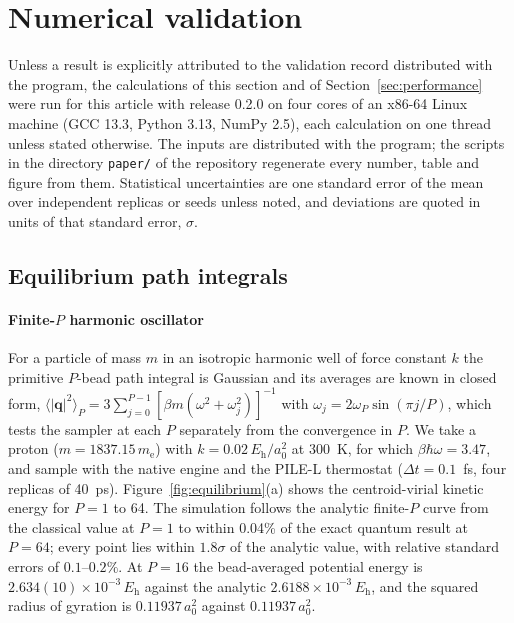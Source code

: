 \documentclass[preprint,12pt]{elsarticle}
\newcommand{\code}[1]{\texttt{#1}}
\newcommand{\Eh}{E_{\mathrm{h}}}
\begin{document}
\section{Numerical validation}
\label{sec:validation}

Unless a result is explicitly attributed to the validation record distributed with the program, the calculations of this section and of Section~\ref{sec:performance} were run for this article with release 0.2.0 on four cores of an x86-64 Linux machine (GCC 13.3, Python 3.13, NumPy 2.5), each calculation on one thread unless stated otherwise. The inputs are distributed with the program; the scripts in the directory \code{paper/} of the repository regenerate every number, table and figure from them. Statistical uncertainties are one standard error of the mean over independent replicas or seeds unless noted, and deviations are quoted in units of that standard error, $\sigma$.

\subsection{Equilibrium path integrals}
\label{sec:val-equilibrium}

\paragraph{Finite-$P$ harmonic oscillator} For a particle of mass $m$ in an isotropic harmonic well of force constant $k$ the primitive $P$-bead path integral is Gaussian and its averages are known in closed form,
$\langle|\mathbf q|^{2}\rangle_P=3\sum_{j=0}^{P-1}[\beta m(\omega^{2}+\omega_j^{2})]^{-1}$ with $\omega_j=2\omega_P\sin(\pi j/P)$, which tests the sampler at each $P$ separately from the convergence in $P$. We take a proton ($m=1837.15\,m_{\mathrm e}$) with $k=0.02\,\Eh/a_0^{2}$ at 300~K, for which $\beta\hbar\omega=3.47$, and sample with the native engine and the PILE-L thermostat ($\Delta t=0.1$~fs, four replicas of 40~ps). Figure~\ref{fig:equilibrium}(a) shows the centroid-virial kinetic energy for $P=1$ to 64. The simulation follows the analytic finite-$P$ curve from the classical value at $P=1$ to within 0.04\% of the exact quantum result at $P=64$; every point lies within $1.8\sigma$ of the analytic value, with relative standard errors of $0.1$--$0.2\%$. At $P=16$ the bead-averaged potential energy is $2.634(10)\times10^{-3}\,\Eh$ against the analytic $2.6188\times10^{-3}\,\Eh$, and the squared radius of gyration is $0.11937\,a_0^{2}$ against $0.11937\,a_0^{2}$.
\end{document}
